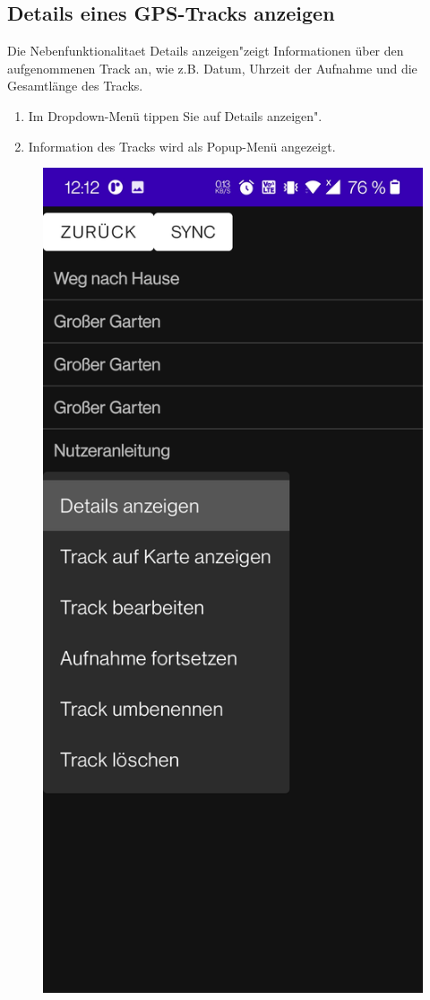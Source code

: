 \documentclass{article}
\begin{document}
	\newpage
\subsection{Details eines GPS-Tracks anzeigen}
	Die Nebenfunktionalitaet \glqq Details anzeigen"\space zeigt Informationen über den aufgenommenen Track an, wie z.B. Datum, Uhrzeit der Aufnahme und die Gesamtlänge des Tracks.\\ 
	\begin{enumerate}
		\item Im Dropdown-Menü tippen Sie auf \glqq Details anzeigen".
		\item Information des Tracks wird als Popup-Menü angezeigt.
	\end{enumerate}
	\begin{figure}[H]
		\captionsetup{justification=centering}
		  \includegraphics[scale=0.15]{4_details.jpg}

\end{figure}
\end{document}
